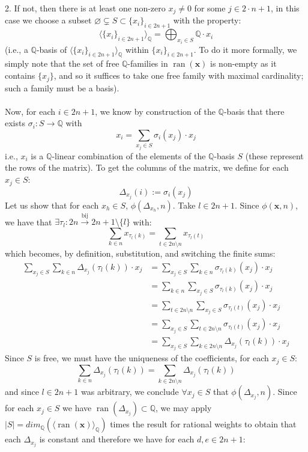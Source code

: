 \documentclass[11pt, a4paper, oneside]{article}
\theoremstyle{remark}
\theoremstyle{lemma}
\begin{document}
2. If not, then there is at least one non-zero $x_j \neq 0$ for some $j \in 2 \cdot n + 1$, in this case we choose a subset $\varnothing\subsetneq S \subset \{x_i\}_{i \in 2n + 1}$ with the property:
\[
\langle \{x_i\}_{i \in 2n + 1} \rangle_{\mathbb{Q}} = \bigoplus_{x_i \in S} \mathbb{Q} \cdot x_i
\]
(i.e., a $\mathbb{Q}$-basis of $\langle \{x_i\}_{i \in 2n + 1} \rangle_{\mathbb{Q}}$ within $\{x_i\}_{i \in 2n + 1}$. To do it more formally, we simply note that the set of free $\mathbb{Q}$-families in $\operatorname{ran}(\textbf{x})$ is non-empty as it contains $\{x_j\}$, and so it suffices to take one free family with maximal cardinality; such a family must be a basis).
\\\\
Now, for each $i \in 2n + 1$, we know by construction of the $\mathbb{Q}$-basis that there exists $\sigma_i: S \rightarrow \mathbb{Q}$ with
\[
x_i = \sum_{x_j \in S} \sigma_i(x_j) \cdot x_j
\]
i.e., $x_i$ is a $\mathbb{Q}$-linear combination of the elements of the $\mathbb{Q}$-basis $S$ (these represent the rows of the matrix). To get the columns of the matrix, we define for each $x_j \in S$:
\[
\Delta_{x_{j}}(i) := \sigma_i(x_j)
\]
Let us show that for each $x_h \in S$, $\phi(\Delta_{x_{h}}, n)$. Take $l \in 2n + 1$. Since $\phi(\textbf{x}, n)$, we have that $\exists \tau_l : 2n \overset{\text{bij}}{\rightarrow} 2n + 1 \setminus \{l\}$ with:
\[
\sum_{k \in n} x_{\tau_l(k)} = \sum_{t \in 2n \setminus n} x_{\tau_l(t)}
\]
which becomes, by definition, substitution, and switching the finite sums:
\begin{align*}
\sum_{x_j \in S} \sum_{k \in n} \Delta_{x_{j}}(\tau_{l}(k)) \cdot x_j &= \sum_{x_j \in S} \sum_{k \in n} \sigma_{\tau_{l}(k)}(x_j) \cdot x_j \\
&= \sum_{k \in n} \sum_{x_j \in S} \sigma_{\tau_{l}(k)}(x_j) \cdot x_j \\
&= \sum_{t \in 2n \setminus n} \sum_{x_j \in S} \sigma_{\tau_{l}(t)}(x_j) \cdot x_j \\
&= \sum_{x_j \in S} \sum_{t \in 2n \setminus n} \sigma_{\tau_{l}(t)}(x_j) \cdot x_j \\
&= \sum_{x_j \in S} \sum_{k \in 2n \setminus n} \Delta_{x_{j}}(\tau_{l}(k)) \cdot x_j
\end{align*}
Since $S$ is free, we must have the uniqueness of the coefficients, for each $x_j \in S$:
\[
\sum_{k \in n} \Delta_{x_{j}}(\tau_{l}(k)) = \sum_{k \in 2n \setminus n} \Delta_{x_{j}}(\tau_{l}(k))
\]
and since $l \in 2n + 1$ was arbitrary, we conclude $\forall x_j \in S$ that $\phi(\Delta_{x_{j}}, n)$. Since for each $x_j \in S$ we have $\operatorname{ran}(\Delta_{x_{j}}) \subset \mathbb{Q}$, we may apply $|S| = dim_{\mathbb{Q}}(\langle \operatorname{ran}(\textbf{x}) \rangle_{\mathbb{Q}})$ times the result for rational weights to obtain that each $\Delta_{x_{j}}$ is constant and therefore we have for each $d, e \in 2n + 1$:
\end{document}
